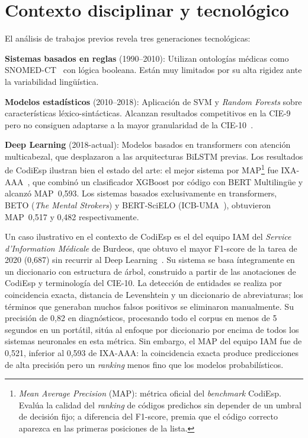 \section{Contexto disciplinar y tecnológico}

El análisis de trabajos previos revela tres generaciones tecnológicas:

\textbf{Sistemas basados en reglas} (1990--2010): Utilizan ontologías médicas como SNOMED-CT~\cite{stearns2001snomedct} con lógica booleana. Están muy limitados por su alta rigidez ante la variabilidad lingüística.

\textbf{Modelos estadísticos} (2010--2018): Aplicación de SVM y \emph{Random Forests} sobre características léxico-sintácticas. Alcanzan resultados competitivos en la CIE-9 pero no consiguen adaptarse a la mayor granularidad de la CIE-10~\cite{perotte2014}.

\textbf{Deep Learning} (2018-actual): Modelos basados en transformers con atención multicabezal, que desplazaron a las arquitecturas BiLSTM previas. Los resultados de CodiEsp ilustran bien el estado del arte: el mejor sistema por MAP\footnote{\emph{Mean Average Precision} (MAP): métrica oficial del \emph{benchmark} CodiEsp. Evalúa la calidad del \emph{ranking} de códigos predichos sin depender de un umbral de decisión fijo; a diferencia del F1-score, premia que el código correcto aparezca en las primeras posiciones de la lista.} fue IXA-AAA~\cite{miranda2020}, que combinó un clasificador XGBoost por código con BERT Multilingüe y alcanzó MAP~0,593. Los sistemas basados exclusivamente en transformers, BETO (\emph{The Mental Strokers}) y BERT-SciELO (ICB-UMA~\cite{lopezgarcia2020icb}), obtuvieron MAP~0,517 y 0,482 respectivamente.

Un caso ilustrativo en el contexto de CodiEsp es el del equipo IAM del \emph{Service d'Information Médicale} de Burdeos, que obtuvo el mayor F1-score de la tarea de 2020 (0,687) sin recurrir al Deep Learning~\cite{cossin2020}. Su sistema se basa íntegramente en un diccionario con estructura de árbol, construido a partir de las anotaciones de CodiEsp y terminología del CIE-10. La detección de entidades se realiza por coincidencia exacta, distancia de Levenshtein y un diccionario de abreviaturas; los términos que generaban muchos falsos positivos se eliminaron manualmente. Su precisión de 0,82 en diagnósticos, procesando todo el corpus en menos de 5 segundos en un portátil, sitúa al enfoque por diccionario por encima de todos los sistemas neuronales en esta métrica. Sin embargo, el MAP del equipo IAM fue de 0,521, inferior al 0,593 de IXA-AAA: la coincidencia exacta produce predicciones de alta precisión pero un \emph{ranking} menos fino que los modelos probabilísticos.

